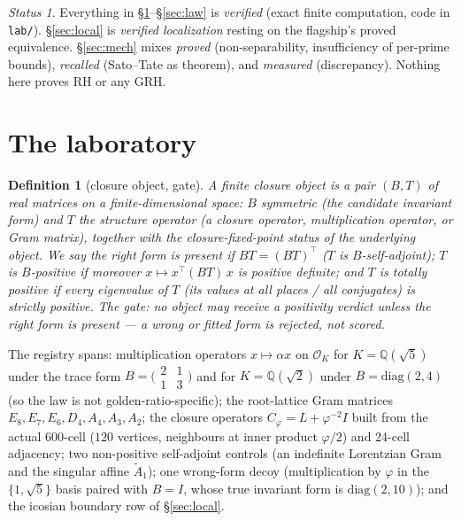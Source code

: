 \documentclass[11pt]{article}
\newtheorem{definition}[theorem]{Definition}
\theoremstyle{remark}
\newtheorem{status}[theorem]{Status}
\newcommand{\OO}{\mathcal{O}}
\newcommand{\KK}{K}
\newcommand{\RH}{\mathrm{RH}}
\begin{document}
\begin{status}
Everything in \S\ref{sec:lab}--\S\ref{sec:law} is \emph{verified} (exact finite
computation, code in \texttt{lab/}). \S\ref{sec:local} is \emph{verified
localization} resting on the flagship's proved equivalence. \S\ref{sec:mech} mixes
\emph{proved} (non-separability, insufficiency of per-prime bounds),
\emph{recalled} (Sato--Tate as theorem), and \emph{measured} (discrepancy).
Nothing here proves $\RH$ or any GRH.
\end{status}

\section{The laboratory}\label{sec:lab}

\begin{definition}[closure object, gate]\label{def:obj}
A \emph{finite closure object} is a pair $(B,T)$ of real matrices on a
finite-dimensional space: $B$ symmetric (the candidate invariant form) and $T$ the
structure operator (a closure operator, multiplication operator, or Gram matrix),
together with the closure-fixed-point status of the underlying object. We say the
\emph{right form is present} if $BT = (BT)^{\!\top}$ ($T$ is $B$-self-adjoint);
$T$ is \emph{$B$-positive} if moreover $x \mapsto x^{\top} (BT)\, x$ is positive
definite; and $T$ is \emph{totally positive} if every eigenvalue of $T$ (its values
at all places / all conjugates) is strictly positive. The \emph{gate}: no object may
receive a positivity verdict unless the right form is present --- a wrong or fitted
form is rejected, not scored.
\end{definition}

The registry spans: multiplication operators $x \mapsto \alpha x$ on
$\OO_{\KK}$ for $\KK = \mathbb{Q}(\sqrt5)$ under the trace form
$B = \big(\begin{smallmatrix}2&1\\1&3\end{smallmatrix}\big)$ and for
$\KK = \mathbb{Q}(\sqrt2)$ under $B = \mathrm{diag}(2,4)$ (so the law is not
golden-ratio-specific); the root-lattice Gram matrices $E_8, E_7, E_6, D_4, A_4,
A_3, A_2$; the closure operators $C_\varphi = L + \varphi^{-2} I$ built from the
actual $600$-cell ($120$ vertices, neighbours at inner product $\varphi/2$) and
$24$-cell adjacency; two non-positive self-adjoint controls (an indefinite Lorentzian
Gram and the singular affine $\tilde A_1$); one wrong-form decoy (multiplication by
$\varphi$ in the $\{1,\sqrt5\}$ basis paired with $B = I$, whose true invariant form
is $\mathrm{diag}(2,10)$); and the icosian boundary row of \S\ref{sec:local}.
\end{document}
